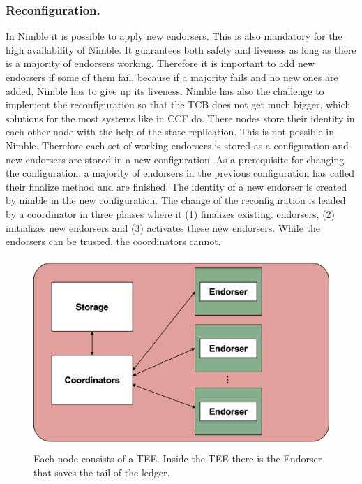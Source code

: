 	\subsubsection*{Reconfiguration.}
	In Nimble it is possible to apply new endorsers. This is also mandatory for the high availability of Nimble. It guarantees both safety and liveness as long as there is a majority of endorsers working. Therefore it is important to add new endorsers if some of them fail, because if a majority fails and no new ones are added, Nimble has to give up its liveness. Nimble has also the challenge to implement the reconfiguration so that the TCB does not get much bigger, which solutions for the most systems like in CCF do. There nodes store their identity in each other node with the help of the state replication. This is not possible in Nimble. Therefore each set of working endorsers is stored as a configuration and new endorsers are stored in a new configuration. As a prerequisite for changing the configuration, a majority of endorsers in the previous configuration has called their finalize method and are finished. The identity of a new endorser is created by nimble in the new configuration. The change of the reconfiguration is leaded by a coordinator in three phases where it (1) finalizes existing. endorsers, (2) initializes new endorsers and (3) activates these new endorsers. While the endorsers can be trusted, the coordinators cannot. 
	
\begin{figure}[b]
	\includegraphics[scale=0.12]{pictures/nimble}
	\caption{Each node consists of a TEE. Inside the TEE there is the Endorser that saves the tail of the ledger.}
	\label{nimble}
\end{figure}

